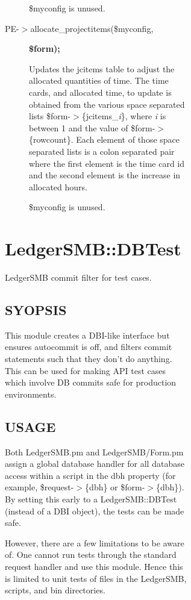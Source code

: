 \begin{description}
\begin{description}
\begin{description}
\begin{description}
\begin{description}
\begin{description}
\$myconfig is unused.


\item[{PE-$>$allocate\_projectitems(\$myconfig,}] \textbf{\$form);}

Updates the jcitems table to adjust the allocated quantities of time.  The
time cards, and allocated time, to update is obtained from the various space
separated lists \$form-$>$\{jcitems\_\textit{i}\}, where \textit{i} is between 1 and the value of
\$form-$>$\{rowcount\}.  Each element of those space separated lists is a colon
separated pair where the first element is the time card id and the second
element is the increase in allocated hours.



\$myconfig is unused.

\end{description}
\section{LedgerSMB::DBTest\label{LedgerSMB::DBTest}}


LedgerSMB commit filter for test cases.

\subsection*{SYOPSIS\label{LedgerSMB::DBTest_SYOPSIS}}


This module creates a DBI-like interface but ensures autocommit is off, 
and filters commit statements such that they don't do anything.  This can be 
used for making API test cases which involve DB commits safe for production 
environments.

\subsection*{USAGE\label{LedgerSMB::DBTest_USAGE}}


Both LedgerSMB.pm and LedgerSMB/Form.pm assign a global database handler for all
database access within a script in the dbh property (for example,
\$request-$>$\{dbh\} or \$form-$>$\{dbh\}).  By setting this early to a
LedgerSMB::DBTest (instead of a DBI object), the tests can be made safe.



However, there are a few limitations to be aware of.  One cannot run tests
through the standard request handler and use this module. Hence this is limited
to unit tests of files in the LedgerSMB, scripts, and bin directories.




\end{description}
\end{description}
\end{description}
\end{description}
\end{description}
